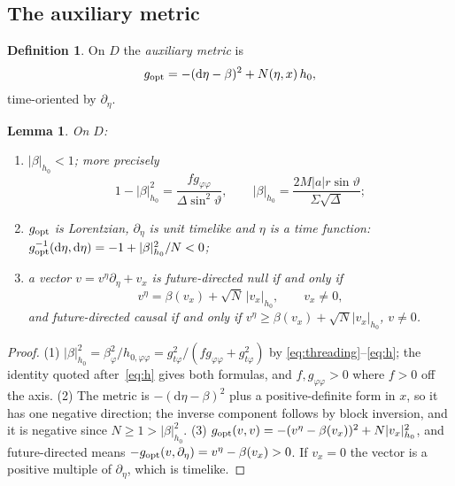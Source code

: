 \documentclass[aip,jmp,amsmath,amssymb,reprint]{revtex4-2}
\newcommand{\dd}{\mathrm{d}}
\newcommand{\gopt}{g_{\rm opt}}
\theoremstyle{plain}
\newtheorem{lemma}[proposition]{Lemma}
\theoremstyle{definition}
\newtheorem{definition}[proposition]{Definition}
\begin{document}
\subsection{The auxiliary metric}
\begin{definition}
On $D$ the \emph{auxiliary metric} is
\begin{equation}
  \gopt=-(\dd\eta-\beta)^2+N(\eta,x)\,h_0 ,
  \label{eq:gopt}
\end{equation}
time-oriented by $\partial_\eta$.
\end{definition}

\begin{lemma}\label{lem:gopt-basic}
On $D$:
\begin{enumerate}
\item $|\beta|_{h_0}<1$; more precisely
  \[
    1-|\beta|_{h_0}^2=\frac{f g_{\varphi\varphi}}{\Delta\sin^2\vartheta},\qquad
    |\beta|_{h_0}=\frac{2M|a|r\sin\vartheta}{\Sigma\sqrt\Delta};
  \]
\item $\gopt$ is Lorentzian, $\partial_\eta$ is unit timelike and $\eta$ is a time
  function: $\gopt^{-1}(\dd\eta,\dd\eta)=-1+|\beta|^2_{h_0}/N<0$;
\item a vector $v=v^\eta\partial_\eta+v_x$ is future-directed null if and only if
  \begin{equation}
    v^\eta=\beta(v_x)+\sqrt N\,|v_x|_{h_0},\qquad v_x\ne0 ,
    \label{eq:null-cone}
  \end{equation}
  and future-directed causal if and only if $v^\eta\ge\beta(v_x)+\sqrt N|v_x|_{h_0}$,
  $v\neq0$.
\end{enumerate}
\end{lemma}

\begin{proof}
(1) $|\beta|^2_{h_0}=\beta_\varphi^2/h_{0,\varphi\varphi}=g_{t\varphi}^2/(fg_{\varphi\varphi}+g_{t\varphi}^2)$ by
\eqref{eq:threading}--\eqref{eq:h}; the identity quoted after~\eqref{eq:h} gives both
formulas, and $f,g_{\varphi\varphi}>0$ where $f>0$ off the axis. (2) The metric is
$-(\dd\eta-\beta)^2$ plus a positive-definite form in $x$, so it has one negative
direction; the inverse component follows by block inversion, and it is negative since
$N\ge1>|\beta|^2_{h_0}$. (3) $\gopt(v,v)=-(v^\eta-\beta(v_x))^2+N|v_x|^2_{h_0}$, and
future-directed means $-\gopt(v,\partial_\eta)=v^\eta-\beta(v_x)>0$. If $v_x=0$ the
vector is a positive multiple of $\partial_\eta$, which is timelike.
\end{proof}
\end{document}
